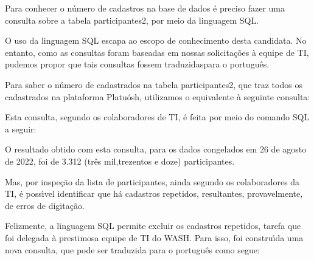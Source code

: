\documentclass[
12pt,		%
openright,	%
twoside,  %
a4paper,			%
chapter=TITLE,		%
english,			%
french,				%
spanish,			%
brazil				%
]{USPSC-classe/USPSC}
\begin{document}
Para conhecer o n\'umero de cadastros na base de dados \'e preciso fazer uma consulta sobre a tabela \textquotedbl participantes2\textquotedbl , por meio da linguagem SQL.




O uso da linguagem SQL escapa ao escopo de conhecimento desta candidata. No entanto, como as consultas foram baseadas em nossas solicita\c{c}\~oes \`a equipe de TI, pudemos propor que tais consultas fossem \textquotedbl traduzidas\textquotedbl  para o portugu\^es.




Para saber o n\'umero de cadastrados na tabela participantes2, que traz todos os cadastrados na plataforma Platu\'osh, utilizamos o equivalente \`a seguinte consulta:





\noindent\begin{center}\mbox{\centering{}}\end{center}







Esta consulta, segundo os colaboradores de TI, \'e feita por meio do comando SQL a seguir:





\noindent\begin{center}\mbox{\centering{}}\end{center}







O resultado obtido com esta consulta, para os dados congelados em 26 de agosto de 2022, foi de 3.312 (tr\^es mil,trezentos e doze) participantes.




Mas, por inspe\c{c}\~ao da lista de participantes, ainda segundo os colaboradores da TI, \'e poss\'{\i}vel identificar que h\'a cadastros repetidos, resultantes, provavelmente, de erros de digita\c{c}\~ao.




Felizmente, a linguagem SQL permite excluir os cadastros repetidos, tarefa que foi delegada \`a prestimosa equipe de TI do WASH. Para isso, foi constru\'{\i}da uma nova consulta, que pode ser traduzida para o portugu\^es como segue:
\end{document}
